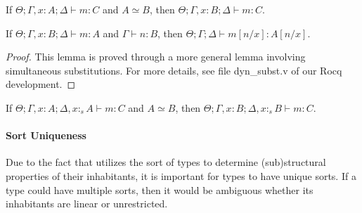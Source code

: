 \begin{corollary}
  If $\Theta ; \Gamma, x : A ; \Delta \vdash m : C$ and 
  $A \simeq B$, then $\Theta ; \Gamma, x : B ; \Delta \vdash m : C$.
\end{corollary}

\begin{lemma}
  If ${\Theta ; \Gamma, x : B ; \Delta \vdash m : A}$ and
  ${\Gamma \vdash n : B}$, then ${\Theta ; \Gamma ; \Delta \vdash m[n/x] : A[n/x]}$.
\end{lemma}
\begin{proof}
  This lemma is proved through a more general lemma involving simultaneous substitutions. 
  For more details, see file \textsf{dyn\_subst.v} of our Rocq development.
\end{proof}

\begin{corollary}
  If ${\Theta ; \Gamma, x : A ; \Delta, x :_s A \vdash m : C}$ and
  $A \simeq B$, then ${\Theta ; \Gamma, x : B ; \Delta, x :_s B \vdash m : C}$.
\end{corollary}

\paragraph{\textbf{Sort Uniqueness}}
Due to the fact that \TLLC{} utilizes the sort of types to determine
(sub)structural properties of their inhabitants, it is important for types
to have unique sorts. If a type could have multiple sorts, then it would be
ambiguous whether its inhabitants are linear or unrestricted.

